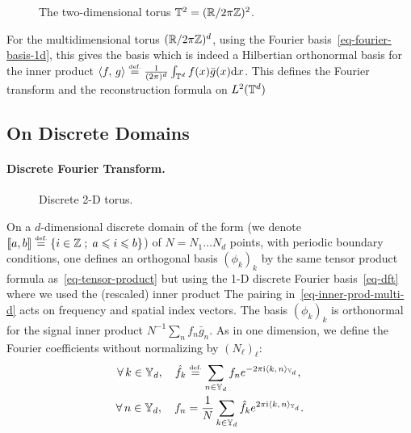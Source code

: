 \begin{figure}[tbp]
\centering
{}
\caption{The two-dimensional torus $\mathbb{T}^2=(\mathbb{R}/2\pi\mathbb{Z})^2$.}
\label{fig-review-fourier-torus}
\end{figure}
For the multidimensional torus $(\mathbb{R}/2\pi\mathbb{Z})^d$, using the Fourier basis~\eqref{eq-fourier-basis-1d}, this gives the basis
which is indeed a Hilbertian orthonormal basis for the inner product $\langle f,\,g\rangle \stackrel{\mbox{\upshape\tiny def.}}{=} \frac{1}{(2\pi)^d} \int_{\mathbb{T}^d} f(x)\bar g(x)\mathrm{d} x$. 
%
This defines the Fourier transform and the reconstruction formula on $L^2(\mathbb{T}^d)$

\subsection{On Discrete Domains}
\label{sec-fft-2d}

\paragraph{Discrete Fourier Transform.}

\begin{figure}[tbp]
\centering
{}
\caption{Discrete 2-D torus.}
\label{fig-review-fourier-torus-discrete}
\end{figure}
On a $d$-dimensional discrete domain of the form
(we denote $\llbracket a,b\rrbracket \stackrel{\mbox{\upshape\tiny def.}}{=} \left\{ i \in \mathbb{Z} \;;\; a \leqslant i \leqslant b \right\}$)
of $N=N_1\ldots N_d$ points, with periodic boundary conditions, one defines an orthogonal basis $(\phi_k)_k$ by the same tensor product formula as~\eqref{eq-tensor-product} but using the 1-D discrete Fourier basis~\eqref{eq-dft}
where we used the (rescaled) inner product
The pairing in~\eqref{eq-inner-prod-multi-d} acts on frequency and spatial index vectors. The basis $(\phi_k)_k$ is orthonormal for the signal inner product $N^{-1}\sum_n f_n\bar g_n$. As in one dimension, we define the Fourier coefficients without normalizing by $(N_\ell)_\ell$:
\begin{align*}
	\forall \, k \in \mathbb{Y}_d, \quad 
	\hat f_k &\stackrel{\mbox{\upshape\tiny def.}}{=} \sum_{n \in \mathbb{Y}_d} f_n e^{-2\pi\mathrm{i}\langle k,\,n\rangle_{\mathbb{Y}_d}}, \\
	\forall \, n \in \mathbb{Y}_d, \quad 
	f_n &= \frac{1}{N} \sum_{k \in \mathbb{Y}_d} \hat f_k e^{2\pi\mathrm{i}\langle k,\,n\rangle_{\mathbb{Y}_d}}.
\end{align*}




